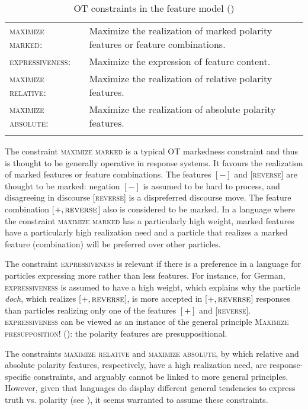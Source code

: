 \documentclass[output=paper,colorlinks,citecolor=brown]{langscibook}
\begin{document}
\begin{table}
\caption{OT constraints in the feature model (\citealt{FarkasRoelofsen2019})}
\label{geist-repp:tab:Optimality-theoretic-constraints}
 \begin{tabularx}{\textwidth}{lQ}
  \lsptoprule
\textsc{maximize marked}:& Maximize the realization of marked polarity features or feature combinations.\\
\textsc{expressiveness}: & Maximize the expression of feature content.\\
\textsc{maximize relative}:  & Maximize the realization of relative polarity features.\\
\textsc{maximize absolute}: & Maximize the realization of absolute polarity features.\\
\lspbottomrule
 \end{tabularx}
\end{table}

The constraint \textsc{maximize marked} is a typical OT markedness constraint and thus is thought to be generally operative in response systems. It favours the realization of marked features or feature combinations. The features $[-]$ and [\textsc{reverse}] are thought to be marked: negation $[-]$ is assumed to be hard to process, and disagreeing in discourse [\textsc{reverse}] is a dispreferred discourse move. The feature combination [$+,\textsc{reverse}$] also is considered to be marked. In a language where the constraint \textsc{maximize marked} has a particularly high weight, marked features have a particularly high realization need and a particle that realizes a marked feature (combination) will be preferred over other particles. 

The constraint \textsc{expressiveness} is relevant if there is a preference in a language for particles expressing more rather than less features. For instance, for German, \textsc{expressiveness} is assumed to have a high weight, which explains why the particle \textit{doch}, which realizes [$+,\textsc{reverse}$], is more accepted in [$+,\textsc{reverse}$] responses than particles realizing only one of the features $[+]$ and [\textsc{reverse}]. \textsc{expressiveness} can be viewed as an instance of the general principle \textsc{Maximize presupposition!} (\citealt{Heim1991}): the polarity features are presuppositional.

The constraints \textsc{maximize relative} and \textsc{maximize absolute}, by which relative and absolute polarity features, respectively, have a high realization need, are response-specific constraints, and arguably cannot be linked to more general principles. However, given that languages do display different general tendencies to express truth vs. polarity (see ), it seems warranted to assume these constraints.
\end{document}
